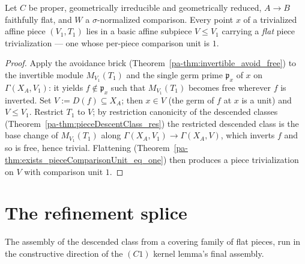 \begin{theorem}
  \label{pa-thm:exists_flat_pieceTrivialization}
  \leanok

  Let \(C\) be proper, geometrically irreducible and geometrically reduced, \(A \to B\) faithfully
  flat, and \(W\) a \(\sigma\)-normalized comparison. Every point \(x\) of a trivialized affine piece
  \((V_1, T_1)\) lies in a basic affine subpiece \(V \le V_1\) carrying a \emph{flat} piece
  trivialization --- one whose per-piece comparison unit is \(1\).
\end{theorem}
\begin{proof}
  \leanok
  Apply the avoidance brick (Theorem~\ref{pa-thm:invertible_avoid_free}) to the invertible module
  \(M_{V_1}(T_1)\) and the single germ prime \(\mathfrak p_x\) of \(x\) on \(\Gamma(X_A, V_1)\): it
  yields \(f \notin \mathfrak p_x\) such that \(M_{V_1}(T_1)\) becomes free wherever \(f\) is
  inverted. Set \(V := D(f) \subseteq X_A\); then \(x \in V\) (the germ of \(f\) at \(x\) is a unit)
  and \(V \le V_1\). Restrict \(T_1\) to \(V\); by restriction canonicity of the descended classes
  (Theorem~\ref{pa-thm:pieceDescentClass_res}) the restricted descended class is the base change of
  \(M_{V_1}(T_1)\) along \(\Gamma(X_A, V_1) \to \Gamma(X_A, V)\), which inverts \(f\) and so is free,
  hence trivial. Flattening (Theorem~\ref{pa-thm:exists_pieceComparisonUnit_eq_one}) then produces a
  piece trivialization on \(V\) with comparison unit \(1\).
\end{proof}

\section{The refinement splice}
\label{pa-sec:effectivitySplice}

The assembly of the descended class from a covering family of flat pieces, run in the constructive
direction of the \((C1)\) kernel lemma's final assembly.


